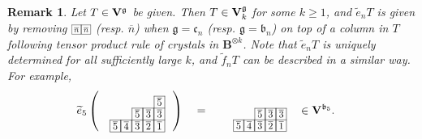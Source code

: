 \documentclass[leqno,11pt]{amsart}
\newtheorem{rem}[thm]{\bf Remark}
\numberwithin{equation}{section}
\newcommand{\B}{\mathbf{B}}
\newcommand{\ov}{\overline}
\newcommand{\te}{\widetilde{e}}
\newcommand{\tf}{\widetilde{f}}
\newcommand{\g}{\mathfrak{g}}
\newcommand{\mf}{\mathfrak}
\begin{document}
\begin{rem}{\rm
Let $T\in {\bf V}^{\g}$ be given. Then $T\in {\bf V}^{\g}_k$ for some $k\geq 1$, and
$\te_nT$ is given by removing $\resizebox{.05\hsize}{!}{\def\lr#1{\multicolumn{1}{|@{\hspace{.6ex}}c@{\hspace{.6ex}}|}{\raisebox{-.25ex}{$#1$}}}\raisebox{-.65ex}
{$\begin{array}[b]{cc}
\cline{1-1}\cline{2-2}
\lr{\ov{n}}&\lr{\ov{n}}\\
\cline{1-1}\cline{2-2}
\end{array}$}}$
(resp. $\boxed{\ov{n}}$) when $\g=\mf c_n$ (resp. $\g=\mf b_n$) on top of a column in $T$ following tensor product rule of crystals in $\B^{\otimes k}$. Note that $\te_nT$ is uniquely determined for all sufficiently large $k$, and $\tf_nT$ can be described in a similar way. For example, \vskip 1mm
\begin{equation*}
\begin{split}
& \te_5 \left(\ \
\resizebox{.15\hsize}{!}{
\text{${\def\lr#1{\multicolumn{1}{|@{\hspace{.6ex}}c@{\hspace{.6ex}}|}{\raisebox{-.3ex}{$#1$}}}\raisebox{-.6ex}
{$\begin{array}{ccccc}
\cline{5-5}
& & & & \lr{\ov{5}} \\
\cline{3-5}
& & \lr{\ov{5}} & \lr{\ov{3}}& \lr{\ov{3}}\\
\cline{1-5}
\lr{\ov{5}} & \lr{\ov{4}} & \lr{\ov{3}} & \lr{\ov{2}}& \lr{\ov{1}}\\
\cline{1-5}
\end{array}$}}$}}\ \ \right) \quad =\quad
\resizebox{.17\hsize}{!}{
\text{${\def\lr#1{\multicolumn{1}{|@{\hspace{.6ex}}c@{\hspace{.6ex}}|}{\raisebox{-.3ex}{$#1$}}}\raisebox{-.6ex}
{$\begin{array}{cccccc}
 & & & & & \\
\cline{4-6}
 & & & \lr{\ov{5}} & \lr{\ov{3}}& \lr{\ov{3}}\\
\cline{2-6}
 &\lr{\ov{5}} & \lr{\ov{4}} & \lr{\ov{3}} & \lr{\ov{2}}& \lr{\ov{1}}\\
\cline{2-6}
\end{array}$}}$}}\quad 
\in {\bf V}^{\mf b_5}.
\end{split}
\end{equation*}
}
\end{rem}
\vskip 2mm
\end{document}
